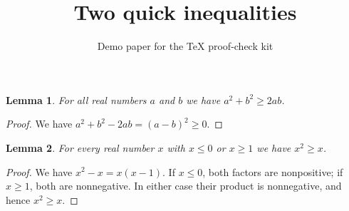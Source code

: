 \documentclass[11pt]{article}
\title{Two quick inequalities}
\author{Demo paper for the TeX proof-check kit}
\date{}
\newtheorem{lemma}{Lemma}
\begin{document}
\maketitle

\begin{lemma}\label{lem:square}
For all real numbers $a$ and $b$ we have $a^2 + b^2 \ge 2ab$.
\end{lemma}

\begin{proof}
We have $a^2 + b^2 - 2ab = (a-b)^2 \ge 0$.
\end{proof}

\begin{lemma}\label{lem:xsquare}
For every real number $x$ with $x \le 0$ or $x \ge 1$ we have $x^2 \ge x$.
\end{lemma}

\begin{proof}
We have $x^2 - x = x(x-1)$. If $x \le 0$, both factors are nonpositive; if $x \ge 1$,
both are nonnegative. In either case their product is nonnegative, and hence $x^2 \ge x$.
\end{proof}
\end{document}

